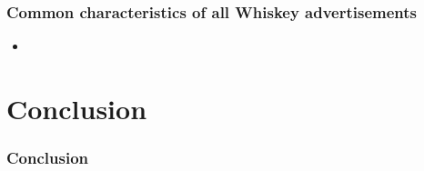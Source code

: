 \documentclass{beamer}
\begin{document}
\begin{frame}
 \frametitle{Common characteristics of all Whiskey advertisements}
 \begin{itemize}
  \item
 \end{itemize}
\end{frame}

\section{Conclusion}

\begin{frame}
 \frametitle{Conclusion}
\end{frame}

\end{document}
